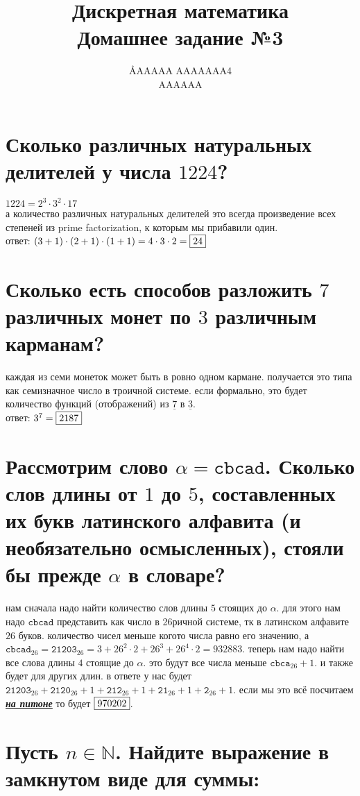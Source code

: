 \documentclass{article}
\title{Дискретная математика \\ Домашнее задание №3}
\author{\AA{AAAAA AAAAAAA}{4} \\ AAAAAA}
\newcommand{\N}{\mathbb{N}}
\newcommand{\range}{\underline}
\begin{document}
  \maketitle

  \section{Сколько различных натуральных делителей у числа $1224$?}
  $1224 = 2^3 \cdot 3^2 \cdot 17$ \\
  а количество различных натуральных делителей это всегда\cite{divisor} произведение всех степеней из prime factorization,
  к которым мы прибавили один. \\
  ответ: $(3+1)\cdot(2+1)\cdot(1+1) = 4\cdot3\cdot2 = \fbox{24}$

  \section{Сколько есть способов разложить $7$ различных монет по $3$ различным карманам?}
  каждая из семи монеток может быть в ровно одном кармане. получается это типа как семизначное число в троичной системе.
  если формально, это будет количество функций (отображений) из $\range{7}$ в $\range{3}$. \\
  ответ: $3^7 = \fbox{2187}$

  \section{Рассмотрим слово $\alpha = \texttt{cbcad}$. Сколько слов длины от $1$ до $5$, составленных их букв латинского алфавита (и необязательно осмысленных), стояли бы прежде $\alpha$ в словаре?}
  нам сначала надо найти количество слов длины $5$ стоящих до $\alpha$.
  для этого нам надо $\texttt{cbcad}$ представить как число в 26ричной системе, тк в латинском алфавите $26$ буков.
  количество чисел меньше когото числа равно его значению,
  а $\texttt{cbcad}_{26} = \texttt{21203}_{26} = 3+26^2\cdot2+26^3+26^4\cdot2 = 932883$.
  теперь нам надо найти все слова длины $4$ стоящие до $\alpha$. это будут все числа меньше $\texttt{cbca}_{26}+1$.
  и также будет для других длин.
  в ответе у нас будет $ \texttt{21203}_{26} + \texttt{2120}_{26}+1 + \texttt{212}_{26}+1 + \texttt{21}_{26}+1 + \texttt{2}_{26}+1$.
  если мы это всё посчитаем \underline{\textit{\textbf{\Large на питоне}}} то будет $\fbox{970202}$.

  \section{Пусть $n \in \N$. Найдите выражение в замкнутом виде для суммы:}
\end{document}
